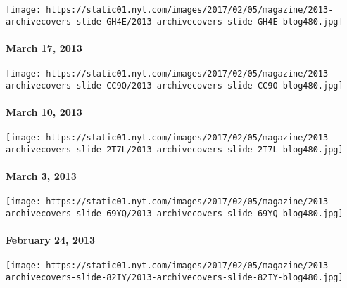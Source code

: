 \href{http://www.nytimes.com/indexes/2013/03/17/magazine/index.html}{}

\texttt{[image: https://static01.nyt.com/images/2017/02/05/magazine/2013-archivecovers-slide-GH4E/2013-archivecovers-slide-GH4E-blog480.jpg]}

\hypertarget{march-17-2013}{%
\paragraph{March 17, 2013}\label{march-17-2013}}

\href{http://www.nytimes.com/indexes/2013/03/10/magazine/index.html}{}

\texttt{[image: https://static01.nyt.com/images/2017/02/05/magazine/2013-archivecovers-slide-CC9O/2013-archivecovers-slide-CC9O-blog480.jpg]}

\hypertarget{march-10-2013}{%
\paragraph{March 10, 2013}\label{march-10-2013}}

\href{http://www.nytimes.com/indexes/2013/03/03/magazine/index.html}{}

\texttt{[image: https://static01.nyt.com/images/2017/02/05/magazine/2013-archivecovers-slide-2T7L/2013-archivecovers-slide-2T7L-blog480.jpg]}

\hypertarget{march-3-2013}{%
\paragraph{March 3, 2013}\label{march-3-2013}}

\href{http://www.nytimes.com/indexes/2013/02/24/magazine/index.html}{}

\texttt{[image: https://static01.nyt.com/images/2017/02/05/magazine/2013-archivecovers-slide-69YQ/2013-archivecovers-slide-69YQ-blog480.jpg]}

\hypertarget{february-24-2013}{%
\paragraph{February 24, 2013}\label{february-24-2013}}

\href{http://www.nytimes.com/indexes/2013/02/17/magazine/index.html}{}

\texttt{[image: https://static01.nyt.com/images/2017/02/05/magazine/2013-archivecovers-slide-82IY/2013-archivecovers-slide-82IY-blog480.jpg]}

